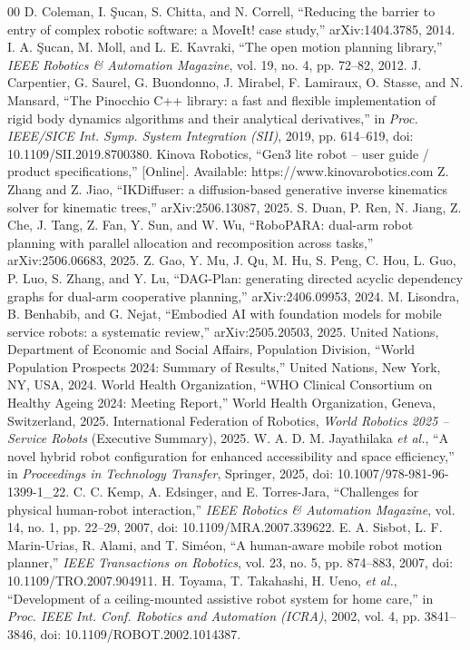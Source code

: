 \documentclass[conference]{IEEEtran}
\begin{document}
\begin{thebibliography}{00}
 D. Coleman, I. {\c{S}}ucan, S. Chitta, and N. Correll, ``Reducing the barrier to entry of complex robotic software: a MoveIt! case study,'' arXiv:1404.3785, 2014.
 I. A. {\c{S}}ucan, M. Moll, and L. E. Kavraki, ``The open motion planning library,'' \textit{IEEE Robotics \& Automation Magazine}, vol. 19, no. 4, pp. 72--82, 2012.
 J. Carpentier, G. Saurel, G. Buondonno, J. Mirabel, F. Lamiraux, O. Stasse, and N. Mansard, ``The Pinocchio C++ library: a fast and flexible implementation of rigid body dynamics algorithms and their analytical derivatives,'' in \textit{Proc. IEEE/SICE Int. Symp. System Integration (SII)}, 2019, pp. 614--619, doi: 10.1109/SII.2019.8700380.
 Kinova Robotics, ``Gen3 lite robot -- user guide / product specifications,'' [Online]. Available: https://www.kinovarobotics.com
 Z. Zhang and Z. Jiao, ``IKDiffuser: a diffusion-based generative inverse kinematics solver for kinematic trees,'' arXiv:2506.13087, 2025.
 S. Duan, P. Ren, N. Jiang, Z. Che, J. Tang, Z. Fan, Y. Sun, and W. Wu, ``RoboPARA: dual-arm robot planning with parallel allocation and recomposition across tasks,'' arXiv:2506.06683, 2025.
 Z. Gao, Y. Mu, J. Qu, M. Hu, S. Peng, C. Hou, L. Guo, P. Luo, S. Zhang, and Y. Lu, ``DAG-Plan: generating directed acyclic dependency graphs for dual-arm cooperative planning,'' arXiv:2406.09953, 2024.
 M. Lisondra, B. Benhabib, and G. Nejat, ``Embodied AI with foundation models for mobile service robots: a systematic review,'' arXiv:2505.20503, 2025.
 United Nations, Department of Economic and Social Affairs, Population Division, ``World Population Prospects 2024: Summary of Results,'' United Nations, New York, NY, USA, 2024.
 World Health Organization, ``WHO Clinical Consortium on Healthy Ageing 2024: Meeting Report,'' World Health Organization, Geneva, Switzerland, 2025.
 International Federation of Robotics, \textit{World Robotics 2025 -- Service Robots} (Executive Summary), 2025.
 W. A. D. M. Jayathilaka \textit{et al.}, ``A novel hybrid robot configuration for enhanced accessibility and space efficiency,'' in \textit{Proceedings in Technology Transfer}, Springer, 2025, doi: 10.1007/978-981-96-1399-1\_22.
 C. C. Kemp, A. Edsinger, and E. Torres-Jara, ``Challenges for physical human-robot interaction,'' \textit{IEEE Robotics \& Automation Magazine}, vol. 14, no. 1, pp. 22--29, 2007, doi: 10.1109/MRA.2007.339622.
 E. A. Sisbot, L. F. Marin-Urias, R. Alami, and T. Sim{\'e}on, ``A human-aware mobile robot motion planner,'' \textit{IEEE Transactions on Robotics}, vol. 23, no. 5, pp. 874--883, 2007, doi: 10.1109/TRO.2007.904911.
 H. Toyama, T. Takahashi, H. Ueno, \textit{et al.}, ``Development of a ceiling-mounted assistive robot system for home care,'' in \textit{Proc. IEEE Int. Conf. Robotics and Automation (ICRA)}, 2002, vol. 4, pp. 3841--3846, doi: 10.1109/ROBOT.2002.1014387.
\end{thebibliography}
\end{document}

